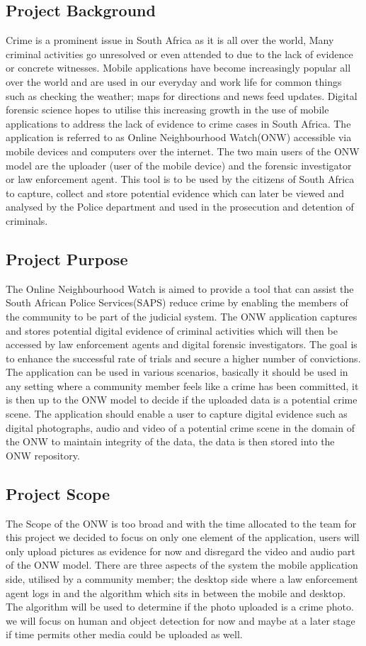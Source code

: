 \documentclass[a4paper,12pt]{article}
\begin{document}
\subsection{Project Background}
Crime is a prominent issue in South Africa as it is all over the world, Many criminal activities go unresolved or even attended to due to the lack of evidence or concrete witnesses.  Mobile applications have become increasingly popular all over the world and are used in our everyday and work life for common things such as checking the weather; maps for directions and news feed updates.  Digital forensic science hopes to utilise this increasing growth in the use of mobile applications to address the lack of evidence to crime cases in South Africa.
The application is referred to as Online Neighbourhood Watch(ONW) accessible via mobile devices and computers over the internet.  The two main users of the ONW model are the uploader (user of the mobile device) and the forensic investigator or law enforcement agent. 
This tool is to be used by the citizens of South Africa to capture, collect and store potential evidence which can later be viewed and analysed by the Police department and used in the prosecution and detention of criminals.
\subsection{Project Purpose}
The Online Neighbourhood Watch is aimed to provide a tool that can assist the South African Police Services(SAPS) reduce crime by enabling the members of the community to be part of the judicial system.  The ONW application captures and stores potential digital evidence of criminal activities which will then be accessed by law enforcement agents and digital forensic investigators.  The goal is to enhance the successful rate of trials and secure a higher number of convictions.
The application can be used in various scenarios, basically it should be used in any setting where a community member feels like a crime has been committed, it is then up to the ONW model to decide if the uploaded data is a potential crime scene. The application should enable a user to capture digital evidence such as digital photographs, audio and video of a potential crime scene in the domain of the ONW to maintain integrity of the data, the data is then stored into the ONW repository.
\subsection{Project Scope}
The Scope of the ONW is too broad and with the time allocated to the team for this project we decided to focus on only one element of the application, users will only upload pictures as evidence for now and disregard the video and audio part of the ONW model.  There are three aspects of the system the mobile application side, utilised by a community member; the desktop side where a law enforcement agent logs in and the algorithm which sits in between the mobile and desktop.  The algorithm will be used to determine if the photo uploaded is a crime photo. we will focus on human and object detection for now and maybe at a later stage if time permits other media could be uploaded as well. 
\end{document}
